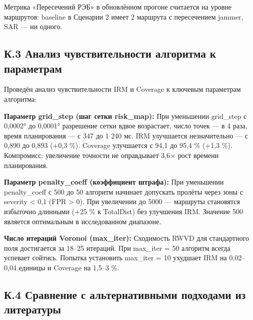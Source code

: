 \documentclass[14pt,a4paper]{extarticle}
\begin{document}
Метрика «Пересечений РЭБ» в обновлённом прогоне считается на уровне маршрутов: baseline в Сценарии 2 имеет 2 маршрута с пересечением jammer, SAR --- ни одного.

\hypertarget{ux43a.3-ux430ux43dux430ux43bux438ux437-ux447ux443ux432ux441ux442ux432ux438ux442ux435ux43bux44cux43dux43eux441ux442ux438-ux430ux43bux433ux43eux440ux438ux442ux43cux430-ux43a-ux43fux430ux440ux430ux43cux435ux442ux440ux430ux43c}{%
\subsection{К.3 Анализ чувствительности алгоритма к параметрам}\label{ux43a.3-ux430ux43dux430ux43bux438ux437-ux447ux443ux432ux441ux442ux432ux438ux442ux435ux43bux44cux43dux43eux441ux442ux438-ux430ux43bux433ux43eux440ux438ux442ux43cux430-ux43a-ux43fux430ux440ux430ux43cux435ux442ux440ux430ux43c}}

Проведён анализ чувствительности IRM и Coverage к ключевым параметрам алгоритма:

\textbf{Параметр grid\_step (шаг сетки risk\_map):} При уменьшении grid\_step с 0,0002° до 0,0001° разрешение сетки вдвое возрастает, число точек --- в 4 раза, время планирования --- с 347 до 1 240 мс. IRM улучшается незначительно --- с 0,890 до 0,893 (+0,3 \%). Coverage улучшается с 94,1 до 95,4 \% (+1,3 \%). Компромисс: увеличение точности не оправдывает 3,6× рост времени планирования.

\textbf{Параметр penalty\_coeff (коэффициент штрафа):} При уменьшении penalty\_coeff с 500 до 50 алгоритм начинает допускать пролёты через зоны с severity \textless{} 0,1 (FPR \textgreater{} 0). При увеличении до 5000 --- маршруты становятся избыточно длинными (+25 \% к TotalDist) без улучшения IRM. Значение 500 является оптимальным в исследованном диапазоне.

\textbf{Число итераций Voronoi (max\_iter):} Сходимость RWVD для стандартного поля достигается за 18--25 итераций. При max\_iter = 50 алгоритм всегда успевает сойтись. Попытка установить max\_iter = 10 ухудшает IRM на 0,02--0,04 единицы и Coverage на 1,5--3 \%.

\hypertarget{ux43a.4-ux441ux440ux430ux432ux43dux435ux43dux438ux435-ux441-ux430ux43bux44cux442ux435ux440ux43dux430ux442ux438ux432ux43dux44bux43cux438-ux43fux43eux434ux445ux43eux434ux430ux43cux438-ux438ux437-ux43bux438ux442ux435ux440ux430ux442ux443ux440ux44b}{%
\subsection{К.4 Сравнение с альтернативными подходами из литературы}\label{ux43a.4-ux441ux440ux430ux432ux43dux435ux43dux438ux435-ux441-ux430ux43bux44cux442ux435ux440ux43dux430ux442ux438ux432ux43dux44bux43cux438-ux43fux43eux434ux445ux43eux434ux430ux43cux438-ux438ux437-ux43bux438ux442ux435ux440ux430ux442ux443ux440ux44b}}
\end{document}
